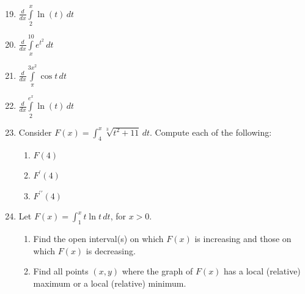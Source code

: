 \documentclass[12pt]{article}
\newif\ifans
\begin{document}
\begin{enumerate}
\setcounter{enumi}{18}

\item $\frac{d}{dx}\int\limits_{2}^{x} \ln{(t)} \,dt$ 

\ifans{\fbox{$\ln{(x)}$}} \fi

\item $\frac{d}{dx}\int\limits_{x}^{10} e^{t^2} \,dt$ 

\ifans{\fbox{$-e^{x^2}$}} \fi

\item $\frac{d}{dx}\int\limits_{\pi}^{3x^2} \cos{t} \,dt$ 

\ifans{\fbox{$6x\cos{\left(3x^2\right)}$}} \fi

\item $\frac{d}{dx}\int\limits_{2}^{e^x} \ln{(t)} \,dt$ 

\ifans{\fbox{$xe^x$}} \fi

\item Consider $F(x)=\int_4^x{\sqrt[3]{t^2+11}} \,dt$. Compute each of the following:

\begin{enumerate}

\item $F(4)$

\ifans{\fbox{$0$}} \fi

\item $F^{\prime}(4)$

\ifans{\fbox{$3$}} \fi

\item $F^{\prime \prime}(4)$

\ifans{\fbox{$\frac{8}{27}$}} \fi

\end{enumerate}

\item Let $F(x)=\int_1^x t\ln{t} \,dt$, for $x>0$.

\begin{enumerate}

\item Find the open interval(s) on which $F(x)$ is increasing and those on which $F(x)$ is decreasing.

\ifans{\fbox{$F(x)$ is increasing on $(1,\infty)$ and is decreasing on $(0,1)$.}} \fi

\item Find all points $(x,y)$ where the graph of $F(x)$ has a local (relative) maximum or a local (relative) minimum.

\ifans{\fbox{$F(x)$ has a local minimum at $(1,0)$ and does not have any local maxima.}} \fi


\end{enumerate}
\end{enumerate}
\end{document}
